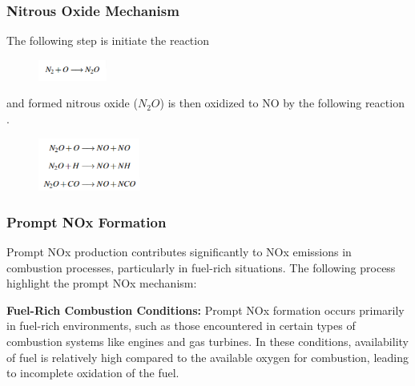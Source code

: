 \subsubsection{Nitrous Oxide Mechanism}
The following step is initiate the reaction

\begin{figure}[h]
	\centering
	\includegraphics[width=0.2\textwidth]{Chapter1/Images/reaction3.png}
\end{figure}
and formed nitrous oxide ($N_2 O$) is then oxidized to NO by the following reaction \cite{LTY2013}.
\begin{figure}[h]
	\centering
	\includegraphics[width=0.3\textwidth]{Chapter1/Images/reaction2.png}
\end{figure}

\subsubsection{Prompt NOx Formation}
Prompt NOx production contributes significantly to NOx emissions in combustion processes, particularly in fuel-rich situations.
The following process highlight the prompt NOx mechanism:

\textbf{Fuel-Rich Combustion Conditions:}
Prompt NOx formation occurs primarily in fuel-rich environments, such as those encountered in certain types of combustion systems like engines and gas turbines. 
In these conditions, availability of fuel is relatively high compared to the available oxygen for combustion, leading to incomplete oxidation of the fuel.

